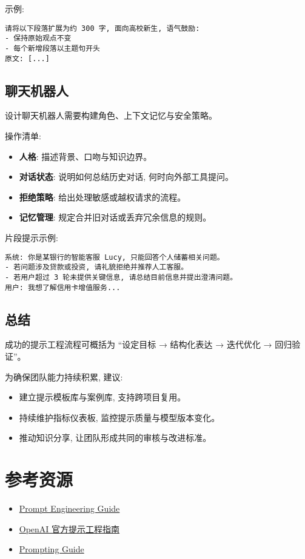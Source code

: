 ﻿\documentclass[12pt]{ctexart}
\begin{document}
示例:\par
\begin{verbatim}
请将以下段落扩展为约 300 字, 面向高校新生, 语气鼓励:
- 保持原始观点不变
- 每个新增段落以主题句开头
原文: [...]
\end{verbatim}

\subsection{聊天机器人}
设计聊天机器人需要构建角色、上下文记忆与安全策略。

操作清单:
\begin{itemize}[leftmargin=*,itemsep=0.4em]
  \item \textbf{人格}: 描述背景、口吻与知识边界。
  \item \textbf{对话状态}: 说明如何总结历史对话, 何时向外部工具提问。
  \item \textbf{拒绝策略}: 给出处理敏感或越权请求的流程。
  \item \textbf{记忆管理}: 规定合并旧对话或丢弃冗余信息的规则。
\end{itemize}

片段提示示例:\par
\begin{verbatim}
系统: 你是某银行的智能客服 Lucy, 只能回答个人储蓄相关问题。
- 若问题涉及贷款或投资, 请礼貌拒绝并推荐人工客服。
- 若用户超过 3 轮未提供关键信息, 请总结目前信息并提出澄清问题。
用户: 我想了解信用卡增值服务...
\end{verbatim}

\subsection{总结}
成功的提示工程流程可概括为 ``设定目标 → 结构化表达 → 迭代优化 → 回归验证''。

为确保团队能力持续积累, 建议:
\begin{itemize}[leftmargin=*,itemsep=0.4em]
  \item 建立提示模板库与案例库, 支持跨项目复用。
  \item 持续维护指标仪表板, 监控提示质量与模型版本变化。
  \item 推动知识分享, 让团队形成共同的审核与改进标准。
\end{itemize}

\section*{参考资源}
\begin{itemize}[leftmargin=*,itemsep=0.4em]
  \item \href{https://prompt-engineering.xiniushu.com/}{Prompt Engineering Guide}
  \item \href{https://platform.openai.com/docs/guides/prompt-engineering}{OpenAI 官方提示工程指南}
  \item \href{https://www.promptingguide.ai/}{Prompting Guide}
\end{itemize}
\end{document}
